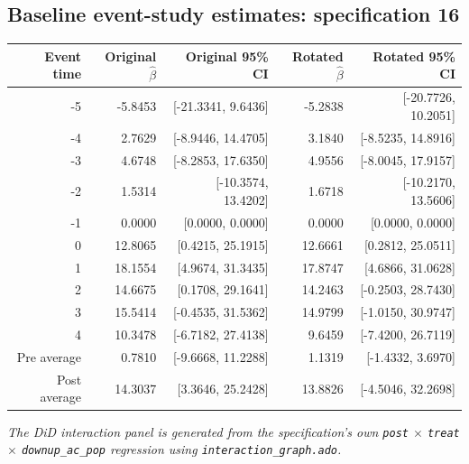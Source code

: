 \documentclass[10pt]{article}
\begin{document}
\subsection*{Baseline event-study estimates: specification 16}
\begin{center}
\scriptsize
\begin{tabular}{r rr rr}
\toprule
Event time & Original $\hat\beta$ & Original 95\% CI & Rotated $\hat\beta$ & Rotated 95\% CI \\
\midrule
-5 & -5.8453 & [-21.3341, 9.6436] & -5.2838 & [-20.7726, 10.2051] \\
-4 & 2.7629 & [-8.9446, 14.4705] & 3.1840 & [-8.5235, 14.8916] \\
-3 & 4.6748 & [-8.2853, 17.6350] & 4.9556 & [-8.0045, 17.9157] \\
-2 & 1.5314 & [-10.3574, 13.4202] & 1.6718 & [-10.2170, 13.5606] \\
-1 & 0.0000 & [0.0000, 0.0000] & 0.0000 & [0.0000, 0.0000] \\
0 & 12.8065 & [0.4215, 25.1915] & 12.6661 & [0.2812, 25.0511] \\
1 & 18.1554 & [4.9674, 31.3435] & 17.8747 & [4.6866, 31.0628] \\
2 & 14.6675 & [0.1708, 29.1641] & 14.2463 & [-0.2503, 28.7430] \\
3 & 15.5414 & [-0.4535, 31.5362] & 14.9799 & [-1.0150, 30.9747] \\
4 & 10.3478 & [-6.7182, 27.4138] & 9.6459 & [-7.4200, 26.7119] \\
\midrule
Pre average & 0.7810 & [-9.6668, 11.2288] & 1.1319 & [-1.4332, 3.6970] \\
Post average & 14.3037 & [3.3646, 25.2428] & 13.8826 & [-4.5046, 32.2698] \\
\bottomrule
\end{tabular}
\end{center}
\medskip
\textit{The DiD interaction panel is generated from the specification's own \texttt{post} $\times$ \texttt{treat} $\times$ \texttt{downup\_ac\_pop} regression using \texttt{interaction\_graph.ado}.}
\clearpage
\end{document}

